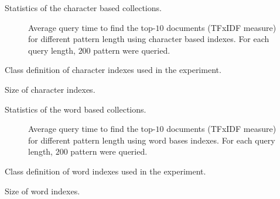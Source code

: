 \documentclass[9pt,a4paper]{scrartcl}
\begin{document}
\pagestyle{empty}

\begin{table}
\centering

\caption{Statistics of the character based collections.}
\end{table}

\begin{figure}

\caption{Average query time to find the top-$10$ documents (TFxIDF measure)
for different pattern length using character based indexes. For each query length, $200$ pattern were
queried.}
\end{figure}

\begin{table}
\centering

\caption{Class definition of character indexes used in the experiment.}
\end{table}

\begin{table}
\centering

\caption{Size of character indexes.}
\end{table}

\begin{table}
\centering

\caption{Statistics of the word based collections.}
\end{table}

\begin{figure}

\caption{Average query time to find the top-$10$ documents (TFxIDF measure)
for different pattern length using word bases indexes. For each query length, $200$ pattern were
queried.}
\end{figure}


\begin{table}
\centering

\caption{Class definition of word indexes used in the experiment.}
\end{table}

\begin{table}
\centering

\caption{Size of word indexes.}
\end{table}
\end{document}
